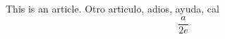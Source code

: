 \documentclass{article}
\begin{document}
This is an article.
Otro articulo, adios, ayuda, cal
\[
	\frac{a}{2e}
\]
\end{document}
